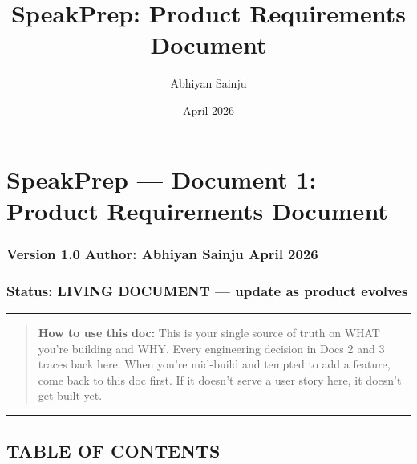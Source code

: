 \documentclass[
  11pt,
]{article}
\title{SpeakPrep: Product Requirements Document}
\author{Abhiyan Sainju}
\date{April 2026}
\begin{document}
\maketitle

\hypertarget{speakprep-document-1-product-requirements-document}{%
\section{SpeakPrep --- Document 1: Product Requirements
Document}\label{speakprep-document-1-product-requirements-document}}

\hypertarget{version-1.0-author-abhiyan-sainju-april-2026}{%
\subsubsection{Version 1.0 \textbar{} Author: Abhiyan Sainju \textbar{}
April 2026}\label{version-1.0-author-abhiyan-sainju-april-2026}}

\hypertarget{status-living-document-update-as-product-evolves}{%
\subsubsection{Status: LIVING DOCUMENT --- update as product
evolves}\label{status-living-document-update-as-product-evolves}}

\begin{center}\rule{0.5\linewidth}{0.5pt}\end{center}

\begin{quote}
\textbf{How to use this doc:} This is your single source of truth on
WHAT you're building and WHY. Every engineering decision in Docs 2 and 3
traces back here. When you're mid-build and tempted to add a feature,
come back to this doc first. If it doesn't serve a user story here, it
doesn't get built yet.
\end{quote}

\begin{center}\rule{0.5\linewidth}{0.5pt}\end{center}

\hypertarget{table-of-contents}{%
\subsection{TABLE OF CONTENTS}\label{table-of-contents}}
\end{document}
